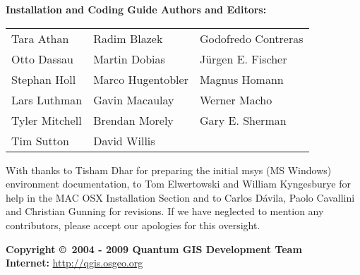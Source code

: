 \begin{flushleft}
\textbf{Installation and Coding Guide Authors and Editors:}
 
\begin{tabular}{p{5cm} p{5cm} p{5cm}}
Tara Athan & Radim Blazek & Godofredo Contreras \\
Otto Dassau & Martin Dobias & J\"urgen E. Fischer \\ 
Stephan Holl & Marco Hugentobler & Magnus Homann \\ 
Lars Luthman & Gavin Macaulay & Werner Macho \\
Tyler Mitchell & Brendan Morely & Gary E. Sherman \\ 
Tim Sutton & David Willis &  \\
\end{tabular}


With thanks to Tisham Dhar for preparing the initial msys (MS Windows)
environment documentation, to Tom Elwertowski and William Kyngesburye for
help in the MAC OSX Installation Section and to Carlos D\'{a}vila, Paolo
Cavallini and Christian Gunning for revisions. If we have neglected to 
mention any contributors, please accept our apologies for this oversight.

\textbf{Copyright \copyright~2004 - 2009 Quantum GIS Development Team} \\
\textbf{Internet:} \url{http://qgis.osgeo.org}
\end{flushleft}

